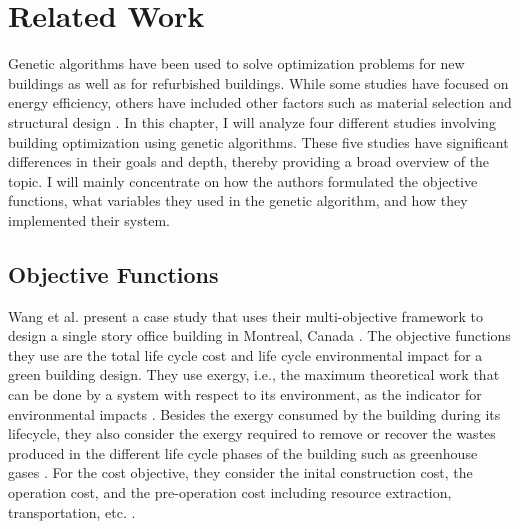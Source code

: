 %
%
\chapter{Related Work}\label{ch:relatedwork}

Genetic algorithms have been used to solve optimization problems for new buildings as well as for refurbished buildings. While some studies have focused on energy efficiency, others have included other factors such as material selection and structural design  \cite{Castro-Lacouture2009} \cite{Behboudi2012}. In this chapter, I will analyze four different studies involving building optimization using genetic algorithms. These five studies have significant differences in their goals and depth, thereby providing a broad overview of the topic. I will mainly concentrate on how the authors formulated the objective functions, what variables they used in the genetic algorithm, and how they implemented their system.

\section{Objective Functions}\label{sec:functions}

Wang et al. present a case study that uses their multi-objective framework to design a single story office building in Montreal, Canada \cite{Wang2005b}. The objective functions they use are the total life cycle cost and life cycle environmental impact for a green building design. They use exergy, i.e., the maximum theoretical work that can be done by a system with respect to its environment, as the indicator for environmental impacts \cite{Wang2005b}. Besides the exergy consumed by the building during its lifecycle, they also consider the exergy required to remove or recover the wastes produced in the different life cycle phases of the building such as greenhouse gases \cite{Wang2005b}. For the cost objective, they consider the inital construction cost, the operation cost, and the pre-operation cost including resource extraction, transportation, etc. \cite{Wang2005b}. 

